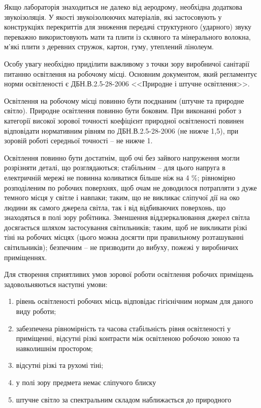 \documentclass[ukrainian,utf8,simple,floatsubsection, hpadding=5mm,equationsubsection,]{eskdtext}
\begin{document}
Якщо лабораторія знаходиться не далеко від аеродрому, необхідна додаткова звукоізоляція. У якості звукоізолюючих матеріалів, які застосовують у конструкціях перекриттів для зниження передачі структурного (ударного) звуку переважно використовують мати та плити із скляного та мінерального волокна, м'які плити з деревних стружок, картон, гуму, утеплений лінолеум.

Особу увагу необхідно приділити важливому з точки зору виробничої санітарії питанню освітлення на робочому місці. Основним документом, який регламентує норми освітленості є ДБН.В.2.5-28-2006 <<Природне і штучне освітлення>>. 

Освітлення на робочому місці повинно бути поєднаним (штучне та природне світло). 
Природне освітлення повинно бути боковим. При виконанні робот з категорії високої 
зорової точності коефіцієнт природної освітленості повинен відповідати нормативним 
рівням по ДБН.В.2.5-28-2006 (не нижче 1,5), при зоровій роботі середньої точності – не нижче 1.

Освітлення повинно бути достатнім, щоб очі без зайвого напруження могли розрізняти деталі, що розглядаються; стабільним – для цього напруга в електричній мережі не повинна коливатися більше ніж на 4 \%; рівномірно розподіленим по робочих поверхнях, щоб очам не доводилося потрапляти з дуже темного місця у світле і навпаки; таким, що не викликає сліпучої дії на око людини як самого джерела світла, так і від відбиваючих поверхонь, що знаходяться в полі зору робітника. 
Зменшення віддзеркалювання джерел світла досягається шляхом застосування світильників; 
таким, щоб не викликати різкі тіні на робочих місцях (цього можна досягти при правильному розташуванні світильників); 
безпечним – не призводити до вибуху, пожежі у виробничих приміщеннях.

Для створення сприятливих умов зорової роботи освітлення робочих приміщень задовольняються наступні умови:
\begin{enumerate}
 \item рівень освітленості робочих місць відповідає гігієнічним нормам для даного виду роботи;
 \item забезпечена рівномірність та часова стабільність рівня освітленості у приміщенні, відсутні різкі контрасти між освітленою робочою зоною та навколишнім простором;
 \item відсутні різкі та рухомі тіні;
 \item у полі зору предмета немає сліпучого блиску
 \item штучне світло за спектральним складом наближається до природного
\end{enumerate}
\end{document}
